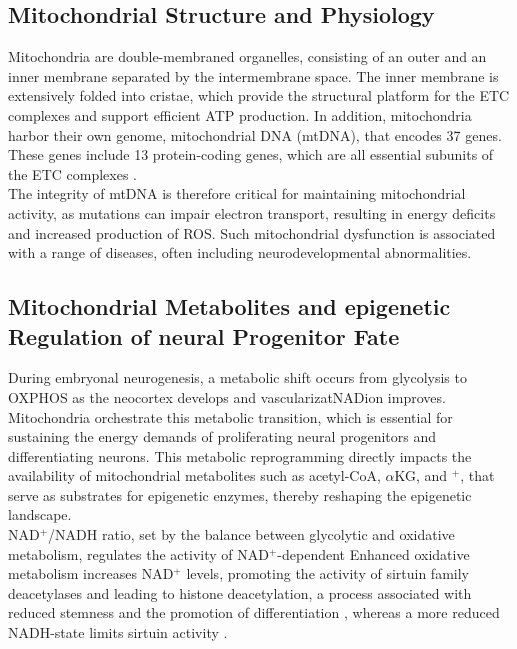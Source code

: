 \subsection{Mitochondrial Structure and Physiology}
Mitochondria are double-membraned organelles, consisting of an outer and an inner membrane separated by the intermembrane space. The inner membrane is extensively folded into cristae, which provide the structural platform for the ETC complexes and support efficient ATP production. In addition, mitochondria harbor their own genome, mitochondrial DNA (\gls{mtDNA}),  that encodes 37 genes. These genes include 13 protein-coding genes, which are all essential subunits of the ETC complexes \citep{andersonSequenceOrganizationHuman1981}.
\\

The integrity of mtDNA is therefore critical for maintaining mitochondrial activity, as mutations can impair electron transport, resulting in energy deficits and increased production of ROS. Such mitochondrial dysfunction is associated with a range of diseases, often including neurodevelopmental abnormalities. 

\subsection{Mitochondrial Metabolites and epigenetic Regulation of neural Progenitor Fate}
During embryonal neurogenesis, a metabolic shift occurs from glycolysis to OXPHOS as the neocortex develops and vascularizatNADion improves. Mitochondria orchestrate this metabolic transition, which is essential for sustaining the energy demands of proliferating neural progenitors and differentiating neurons. This metabolic reprogramming directly impacts the availability of mitochondrial metabolites such as acetyl-CoA, $\alpha$KG, and $^+$, that serve as substrates for epigenetic enzymes, thereby reshaping the epigenetic landscape.
\\

NAD$^+$/NADH ratio, set by the balance between glycolytic  and oxidative metabolism, regulates the activity of NAD$^+$-dependent  Enhanced oxidative metabolism increases NAD$^+$ levels, promoting the activity of sirtuin family deacetylases and leading to histone deacetylation, a process associated with reduced stemness and the promotion of differentiation \citep{saundersMiRNAsRegulateSIRT12010,houtkooperSirtuinsRegulatorsMetabolism2012},  whereas a more reduced NADH-state limits sirtuin activity \citep{haigisMammalianSirtuinsBiological2010}.
\\

